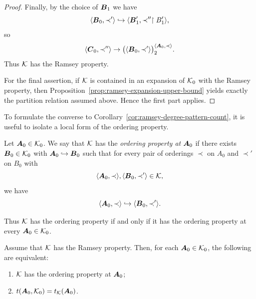 \begin{proof}
    Finally, by the choice of \(\boldsymbol{B}_1\) we have
    \[
        \langle\boldsymbol{B}_0,\prec'\rangle\hookrightarrow\langle\boldsymbol{B}_1',\prec''\restriction B_1'\rangle,
    \]
    so
    \[
        \langle\boldsymbol{C}_0,\prec''\rangle\to
        \bigl(\langle\boldsymbol{B}_0,\prec'\rangle\bigr)^{\langle\boldsymbol{A}_0,\prec\rangle}_{2}.
    \]
    Thus \(\mathcal{K}\) has the Ramsey property.

    For the final assertion, if \(\mathcal{K}\) is contained in an expansion of \(\mathcal{K}_0\) with the Ramsey property, then Proposition~\ref{prop:ramsey-expansion-upper-bound} yields exactly the partition relation assumed above. Hence the first part applies.
\end{proof}

To formulate the converse to Corollary~\ref{cor:ramsey-degree-pattern-count}, it is useful to isolate a local form of the ordering property.

\begin{definition}
    Let \(\boldsymbol{A}_0\in\mathcal{K}_0\). We say that \(\mathcal{K}\) has the \emph{ordering property at} \(\boldsymbol{A}_0\) if there exists \(\boldsymbol{B}_0\in\mathcal{K}_0\) with \(\boldsymbol{A}_0\hookrightarrow\boldsymbol{B}_0\) such that for every pair of orderings \(\prec\) on \(A_0\) and \(\prec'\) on \(B_0\) with
    \[
        \langle\boldsymbol{A}_0,\prec\rangle,\langle\boldsymbol{B}_0,\prec'\rangle\in\mathcal{K},
    \]
    we have
    \[
        \langle\boldsymbol{A}_0,\prec\rangle\hookrightarrow\langle\boldsymbol{B}_0,\prec'\rangle.
    \]
\end{definition}

Thus \(\mathcal{K}\) has the ordering property if and only if it has the ordering property at every \(\boldsymbol{A}_0\in\mathcal{K}_0\).

\begin{proposition}
    \label{prop:local-ordering-property-ramsey-degree}
    Assume that \(\mathcal{K}\) has the Ramsey property. Then, for each \(\boldsymbol{A}_0\in\mathcal{K}_0\), the following are equivalent:

    \begin{enumerate}
        \item[(i)] \(\mathcal{K}\) has the ordering property at \(\boldsymbol{A}_0\);
        \item[(ii)] \(t(\boldsymbol{A}_0,\mathcal{K}_0)=t_{\mathcal{K}}(\boldsymbol{A}_0)\).
    \end{enumerate}
\end{proposition}


